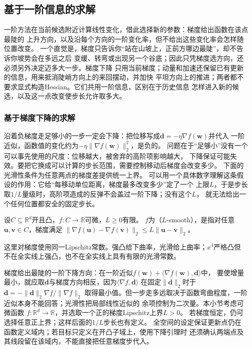 \subsection{基于一阶信息的求解}
\label{sec:opt-first-order-methods}

一阶方法在当前候选附近计算线性变化，借此选择新的参数：梯度给出函数在该点最陡的
上升方向，以及沿每个方向的一阶变化率，但不给出这些变化率会怎样随位置改变。
一个直觉是，梯度只告诉你“站在山坡上，正前方哪边最陡”，却不告诉你坡势会在多远之后
变缓、转弯或出现另一个谷底；因此只凭梯度选方向，还必须另外决定迈多大一步。梯度下降
只用当前梯度；动量和加速还保留已有更新的信息，用来抵消陡峭方向上的来回摆动，并加快
平坦方向上的推进；两者都不要求显式构造Hessian。它们共用一阶信息，区别在于历史信息
怎样进入新的候选，以及这一点改变使步长允许取多大。

\subsubsection{基于梯度下降的求解}
\label{sec:opt-gradient-descent}

沿着负梯度走足够小的一步一定会下降：把位移写成$\bm d=-\eta\nabla f(\bm w)$并代入
一阶近似，函数值的变化约为$-\eta\lVert\nabla f(\bm w)\rVert_2^2$，是负的。
问题在于“足够小”没有一个可以事先使用的尺度：位移越大，被舍弃的高阶项影响越大，
下降保证可能失效。要把它换成可以计算的步长范围，需要控制移动后梯度会改变多少。
下面的光滑性条件为任意两点的梯度差提供统一上界。
可以用一个具体数字理解这条假设的作用：它给“每移动单位距离，梯度最多改变多少”定了一个
上限$L$，于是步长取$1/L$量级时，高阶项造成的反弹不会盖过一阶下降；没有这个$L$，
就无法给出一个任何位置都安全的固定步长。
\begin{definition}[欧氏梯度光滑性]
\label{def:opt-smoothness}
设$C\subseteq\mathbb R^d$开且凸，$f:C\to\mathbb R$可微，$L\geq0$有限。
$f$为（$L$-smooth），是指对任意$\bm u,\bm v\in C$，梯度满足
$\lVert\nabla f(\bm{u})-\nabla f(\bm{v})\rVert_2
\leq L\lVert\bm{u}-\bm{v}\rVert_2$。
\end{definition}
这里对梯度使用同一Lipschitz常数。强凸给下曲率，光滑给上曲率；$x^4$严格凸但
不在全实线上强凸，也不在全实线上具有有限的光滑常数。

梯度给出最陡的一阶下降方向：在一阶近似$f(\bm w)+\langle\nabla f(\bm w),\bm d\rangle$中，
要使增量最小，就应取$\bm d$与梯度方向相反，因为$\langle\nabla f,\bm d\rangle$
在固定$\lVert\bm d\rVert_2$时于$\bm d=-\lVert\bm d\rVert_2\nabla f/\lVert\nabla f\rVert_2$
取得最小值。但一步走多远取决于函数弯曲程度，一阶近似本身不能回答；光滑性把局部线性近似的
余项控制为二次量。本小节考虑可微函数
$f:\mathbb R^d\to\mathbb R$，并选取一个正的梯度Lipschitz上界$L>0$。
若梯度恒定，仍可选择任意正上界；这样后面的$1/L$步长也有定义。
全空间的设定保证更新点仍在函数定义域内；若目标只定义在开凸子域上，使用下降引理时
还须确认两端点及其线段留在该域内，不能直接把任意梯度步代入。

